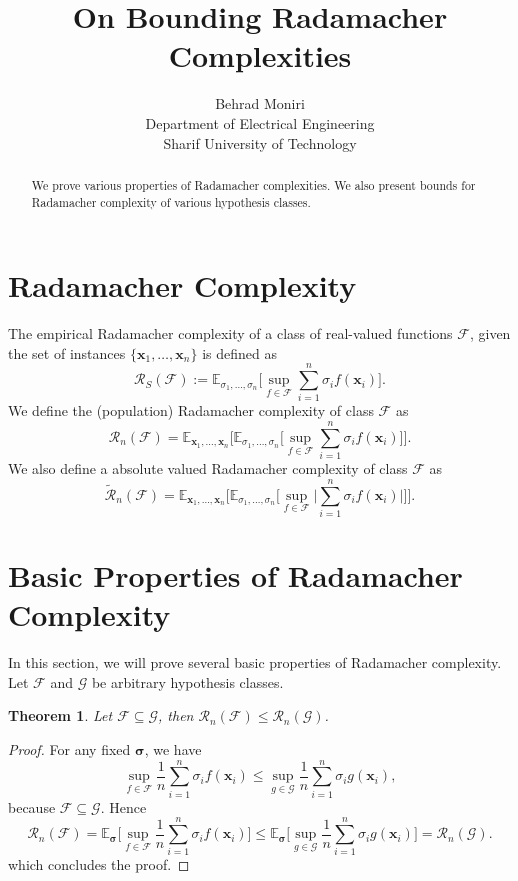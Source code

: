 \documentclass[]{article}
\title{On Bounding Radamacher Complexities}
\author{Behrad Moniri\\
	{\small Department of Electrical Engineering}\\{\small Sharif University of Technology}}
\date{}
\newtheorem{theorem}{Theorem}
\newcommand{\bx}{\mathbf{x}}
\newcommand{\bsigma}{{\boldsymbol{\sigma}}}
\newcommand{\cF}{\mathcal{F}}
\newcommand{\Rad}{\mathcal{R}}
\newcommand{\E}{\mathbb{E}}
\begin{document}

	\maketitle
	\begin{abstract}
		We prove various properties of Radamacher complexities. We also present bounds for Radamacher complexity of various hypothesis classes.
	\end{abstract}

	\section{Radamacher Complexity}
	The empirical Radamacher complexity of a class of real-valued functions $\cF$, given the set of instances $\{\bx_1, \dots, \bx_n\}$ is defined as
	\begin{equation*}
		\mathcal{R}_S(\cF) := \E_{\sigma_1, \dots, \sigma_n} \Big[\sup_{f\in\cF}\sum_{i = 1}^{n} \sigma_i f(\bx_i)\Big].
	\end{equation*}
	We define the (population) Radamacher complexity of class $\cF$ as
	\begin{equation*}
		\mathcal{R}_n(\cF) = \E_{\bx_1, \dots, \bx_n}\Big[\E_{\sigma_1, \dots, \sigma_n} \Big[\sup_{f\in\cF}\sum_{i = 1}^{n} \sigma_i f(\bx_i)\Big]\Big].
	\end{equation*}
	We also define a absolute valued Radamacher complexity of class $\cF$ as
	\begin{equation*}
	\widetilde{\mathcal{R}}_n(\cF) = \E_{\bx_1, \dots, \bx_n}\Big[\E_{\sigma_1, \dots, \sigma_n} \Big[\sup_{f\in\cF}\Big|\sum_{i = 1}^{n} \sigma_i f(\bx_i)\Big|\Big]\Big].
	\end{equation*}
		
	\section{Basic Properties of Radamacher Complexity}
	In this section, we will prove several basic properties of Radamacher complexity. Let $\cF$ and $\mathcal{G}$ be arbitrary hypothesis classes.
	\begin{theorem}
		Let $\mathcal{F} \subseteq \mathcal{G}$,
		then $\mathcal{R}_n(\mathcal{F}) \leq \mathcal{R}_n(\mathcal{G})$.			
	\end{theorem}
	\begin{proof}
		For any fixed $\bsigma$, we have
		\begin{equation*}
		\sup_{f\in\cF}\frac{1}{n}\sum_{i = 1}^{n}\sigma_i f(\bx_i) \leq \sup_{g\in\mathcal{G}}\frac{1}{n}\sum_{i = 1}^{n}\sigma_i g(\bx_i),
		\end{equation*}
		because $\cF\subseteq \mathcal{G}$. Hence			
		\begin{equation*}
		\Rad_n(\cF) = \E_\bsigma\Big[\sup_{f\in\cF}\frac{1}{n}\sum_{i = 1}^{n}\sigma_i f(\bx_i)\Big] \leq \E_\bsigma\Big[\sup_{g\in\mathcal{G}}\frac{1}{n}\sum_{i = 1}^{n}\sigma_i g(\bx_i)\Big] = \Rad_n(\mathcal{G}).
		\end{equation*}
		which concludes the proof.
	\end{proof}
	
\end{document}
